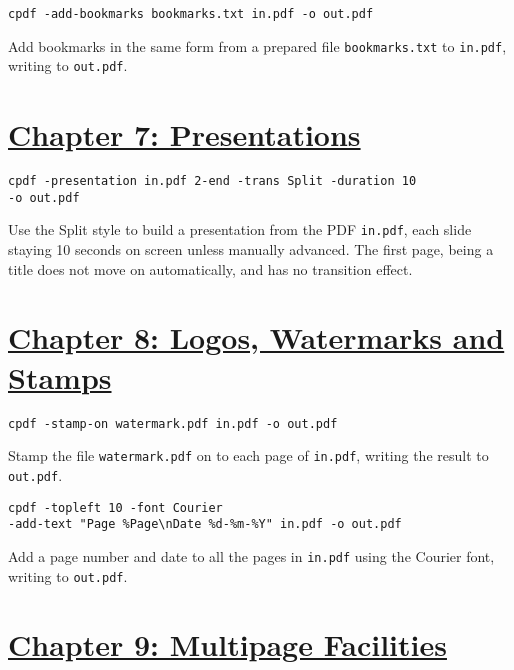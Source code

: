 \documentclass{book}
\begin{document}
\begin{framed}\noindent\texttt{cpdf -add-bookmarks bookmarks.txt in.pdf -o out.pdf}\end{framed}

\noindent Add bookmarks in the same form from a prepared file \texttt{bookmarks.txt} to \texttt{in.pdf}, writing to \texttt{out.pdf}.


\section*{\hyperref[chap:7]{Chapter 7: Presentations}}

\begin{framed}\noindent\texttt{cpdf -presentation in.pdf 2-end -trans Split -duration 10\\\phantom{\ \ \ \ } -o out.pdf}\end{framed}

\noindent Use the Split style to build a presentation from the PDF \texttt{in.pdf}, each slide staying 10 seconds on screen unless manually advanced. The first page, being a title does not move on automatically, and has no transition effect.

\section*{\hyperref[chap:8]{Chapter 8: Logos, Watermarks and Stamps}}

\begin{framed}\noindent\texttt{cpdf -stamp-on watermark.pdf in.pdf -o out.pdf}\end{framed}

\noindent Stamp the file \texttt{watermark.pdf} on to each page of \texttt{in.pdf}, writing the result to \texttt{out.pdf}.

\begin{framed}\noindent\texttt{cpdf -topleft 10 -font Courier\\ \phantom{\ \ \ \ } -add-text "Page \%Page\textbackslash nDate \%d-\%m-\%Y" in.pdf -o out.pdf}\end{framed}

\noindent Add a page number and date to all the pages in \texttt{in.pdf} using the Courier font, writing to \texttt{out.pdf}.

\section*{\hyperref[chap:9]{Chapter 9: Multipage Facilities}}
\end{document}
